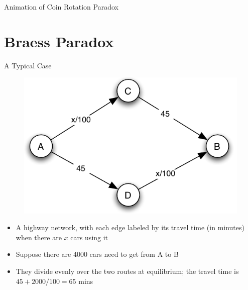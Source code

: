 \documentclass[10pt]{beamer}
\begin{document}
\begin{frame}{Animation of Coin Rotation Paradox}
  
\end{frame}

\section{Braess Paradox}

\begin{frame}{A Typical Case}
  \begin{figure}
    \includegraphics[scale=.8,page=1]{fig/note02/braess.pdf}
  \end{figure}
  \onslide<+->
  \begin{itemize}[<+->]
    \item A highway network, with each edge labeled by its travel time (in minutes) when there are $x$ cars using it
    \item Suppose there are 4000 cars need to get from A to B 
    \item They divide evenly over the two routes at equilibrium; the travel time is $45 + 2000 / 100 = 65$ mins
  \end{itemize}
\end{frame}
\end{document}
